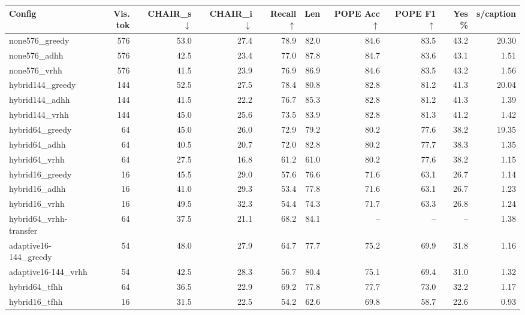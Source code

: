 \begin{tabular}{lrrrrrrrrr}
\toprule
Config & Vis. tok & CHAIR\_s $\downarrow$ & CHAIR\_i $\downarrow$ & Recall $\uparrow$ & Len & POPE Acc $\uparrow$ & POPE F1 $\uparrow$ & Yes \% & s/caption \\
\midrule
none576\_greedy & 576 & 53.0 & 27.4 & 78.9 & 82.0 & 84.6 & 83.5 & 43.2 & 20.30 \\
none576\_adhh & 576 & 42.5 & 23.4 & 77.0 & 87.8 & 84.7 & 83.6 & 43.1 & 1.51 \\
none576\_vrhh & 576 & 41.5 & 23.9 & 76.9 & 86.9 & 84.6 & 83.5 & 43.2 & 1.56 \\
hybrid144\_greedy & 144 & 52.5 & 27.5 & 78.4 & 80.8 & 82.8 & 81.2 & 41.3 & 20.04 \\
hybrid144\_adhh & 144 & 41.5 & 22.2 & 76.7 & 85.3 & 82.8 & 81.2 & 41.3 & 1.39 \\
hybrid144\_vrhh & 144 & 45.0 & 25.6 & 73.5 & 83.9 & 82.8 & 81.3 & 41.2 & 1.42 \\
hybrid64\_greedy & 64 & 45.0 & 26.0 & 72.9 & 79.2 & 80.2 & 77.6 & 38.2 & 19.35 \\
hybrid64\_adhh & 64 & 40.5 & 20.7 & 72.0 & 82.8 & 80.2 & 77.7 & 38.3 & 1.35 \\
hybrid64\_vrhh & 64 & 27.5 & 16.8 & 61.2 & 61.0 & 80.2 & 77.6 & 38.2 & 1.15 \\
hybrid16\_greedy & 16 & 45.5 & 29.0 & 57.6 & 76.6 & 71.6 & 63.1 & 26.7 & 1.14 \\
hybrid16\_adhh & 16 & 41.0 & 29.3 & 53.4 & 77.8 & 71.6 & 63.1 & 26.7 & 1.23 \\
hybrid16\_vrhh & 16 & 49.5 & 32.3 & 54.4 & 74.3 & 71.7 & 63.3 & 26.8 & 1.24 \\
hybrid64\_vrhh-transfer & 64 & 37.5 & 21.1 & 68.2 & 84.1 & – & – & – & 1.38 \\
adaptive16-144\_greedy & 54 & 48.0 & 27.9 & 64.7 & 77.7 & 75.2 & 69.9 & 31.8 & 1.16 \\
adaptive16-144\_vrhh & 54 & 42.5 & 28.3 & 56.7 & 80.4 & 75.1 & 69.4 & 31.0 & 1.32 \\
hybrid64\_tfhh & 64 & 36.5 & 22.9 & 69.2 & 77.8 & 77.7 & 73.0 & 32.2 & 1.17 \\
hybrid16\_tfhh & 16 & 31.5 & 22.5 & 54.2 & 62.6 & 69.8 & 58.7 & 22.6 & 0.93 \\
\bottomrule
\end{tabular}
